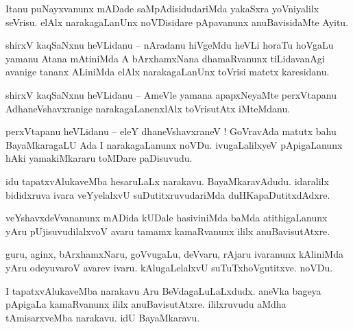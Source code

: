 \documentclass{article}
\begin{document}
\begin{mn}%
Itanu puNayxvanunx mADade saMpAdisidudariMda yakaSxra yoVniyalilx seVrisu. elAlx narakagaLanUnx 
noVDisidare pApavanunx anuBavisidaMte Ayitu.
\end{mn}

\begin{mn}%
shirxV kaqSaNxnu heVLidanu -- nAradanu hiVgeMdu heVLi horaTu hoVgaLu yamanu Atana mAtiniMda A 
bArxhamxNana dhamaRvanunx tiLidavanAgi avanige tananx ALiniMda elAlx narakagaLanUnx toVrisi 
matetx karesidanu.
\end{mn}


\begin{mn}%
shirxV kaqSaNxnu heVLidanu -- AmeVle yamana apapxNeyaMte perxVtapanu AdhaneVshavxranige 
narakagaLanenxlAlx toVrisutAtx iMteMdanu.
\end{mn}

\begin{mn}%
perxVtapanu heVLidanu -- eleY dhaneVshavxraneV ! GoVravAda matutx bahu BayaMkaragaLU Ada I 
narakagaLanunx noVDu. ivugaLalilxyeV pApigaLanunx hAki yamakiMkararu toMDare paDisuvudu.
\end{mn}

\begin{mn}%
idu tapatxvAlukaveMba hesaruLaLx narakavu. BayaMkaravAdudu. idaralilx bididxruva ivara veYyelalxvU 
suDutitxruvudariMda duHKapaDutitxdAdxre.
\end{mn}

\begin{mn}%
veYshavxdeVvananunx mADida kUDale hasiviniMda baMda atithigaLanunx yAru pUjisuvudilalxvoV avaru 
tamamx kamaRvanunx ililx anuBavisutAtxre.
\end{mn}

\begin{mn}%
guru, aginx, bArxhamxNaru, goVvugaLu, deVvaru, rAjaru ivaranunx kAliniMda yAru odeyuvaroV avarev 
ivaru. kAlugaLelalxvU suTuTxhoVgutitxve. noVDu.
\end{mn}

\begin{mn}%
I tapatxvAlukaveMba narakavu Aru BeVdagaLuLaLxdudx. aneVka bageya pApigaLa kamaRvanunx ililx 
anuBavisutAtxre. ililxruvudu aMdha tAmisarxveMba narakavu. idU BayaMkaravu.
\end{mn}
\end{document}
